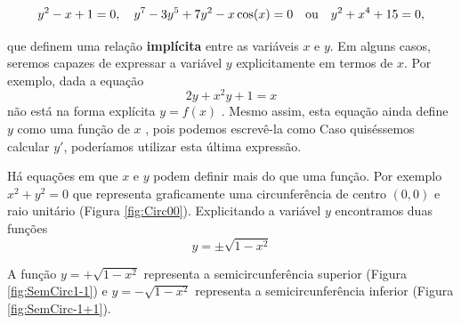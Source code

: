 \cleardoublepage\documentclass[../main.tex]{subfiles}
\begin{document}
\[ y^2-x+1=0, \quad y^7-3y^5+7y^2-x\,{\rm cos}(x)=0\quad \mbox{ou}\quad y^2+x^4+15=0, \]

que definem uma relação \textbf{implícita} entre as variáveis \(x\) e \(y\). Em alguns casos, seremos capazes de expressar a variável \(y\) explicitamente em termos de \(x\). Por exemplo, dada a equação
 $$2y +x^2 y +1= x$$ não está na forma explícita $y = f (x )$ . Mesmo assim, esta equação ainda define $y$ como uma função  de $x$ , pois podemos escrevê-la como 
Caso quiséssemos calcular $y'$, poderíamos utilizar esta última expressão. 

Há equações em que  $x$ e $y$ podem definir mais do que uma função. Por exemplo $x^2+y^2=0$ que 
representa graficamente uma circunferência de centro $(0,0)$ e raio unitário (Figura \ref{fig:Circ00}). Explicitando a 
variável $y$ encontramos duas funções 
$$y=\pm\sqrt{1-x^2}$$

A função $y=+\sqrt{1-x^2}$ representa a semicircunferência superior (Figura \ref{fig:SemCirc1-1}) e $y=-\sqrt{1-x^2}$
representa a semicircunferência inferior (Figura \ref{fig:SemCirc-1+1}). 
\begin{figure}[H]
    \centering
    \hfill
{}\hfill
{}
\caption{}\label{Circunf-x^2+y^2=1}
\end{figure}
\end{document}
